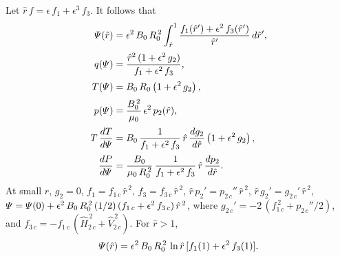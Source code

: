 \documentclass[12pt,prb,aps,notitlepage]{revtex4-1}
\begin{document}
Let $\hat{r}\,f = \epsilon\,f_1+\epsilon^3\,f_3$. 
It follows that
\begin{align}
{\mit\Psi}(\hat{r}) &= \epsilon^2\,B_0\,R_0^{\,2}\int_{\hat{r}}^1\frac{f_1(\hat{r}') +\epsilon^2\,f_3(\hat{r}')}{\hat{r}'}\,d\hat{r}',\\[0.5ex]
q({\mit\Psi})&= \frac{\hat{r}^2\,(1+\epsilon^2\,g_2)}{f_1+\epsilon^2\,f_3},\\[0.5ex]
T({\mit\Psi}) &= B_0\,R_0\left(1+\epsilon^2\,g_2\right),\\[0.5ex]
p({\mit\Psi})&= \frac{B_0^{\,2}}{\mu_0}\,\epsilon^2\,p_2(\hat{r}),\\[0.5ex]
T\,\frac{dT}{d{\mit\Psi}}&= B_0\,\frac{1}{f_1+\epsilon^2\,f_3}\,\hat{r}\,\frac{dg_2}{d\hat{r}}\left(1+\epsilon^2\,g_2\right),\\[0.5ex]
\frac{dP}{d{\mit\Psi}} &=\frac{B_0}{\mu_0\,R_0^{\,2}}\,\frac{1}{f_1+\epsilon^2\,f_3}\,\hat{r}\,\frac{dp_2}{d\hat{r}}.
\end{align}
At small $\hat{r}$, $g_2=0$, $f_1=f_{1\,c}\,\hat{r}^{\,2}$,  $f_3=f_{3\,c}\,\hat{r}^{\,2}$, $\hat{r}\,p_2'=p_{2\,c}''\,\hat{r}^{\,2}$, $\hat{r}\,g_2' = g_{2\,c}'\,\hat{r}^{\,2}$, 
${\mit\Psi}= {\mit\Psi}(0) + \epsilon^2\,B_0\,R_0^{\,2}\,(1/2)\,(f_{1\,c}+\epsilon^2\,f_{3\,c})\,\hat{r}^{\,2}$, 
where $g_{2\,c}'= -2\,(f_{1\,c}^{\,2}+p_{2\,c}''/2)$, and $f_{3\,c}=-f_{1\,c}\,(\hat{H}_{2\,c}^{\,2}+\hat{V}_{2\,c}^{\,2})$. 
For $\hat{r}>1$, 
\begin{equation}
{\mit\Psi}(\hat{r}) = \epsilon^2\,B_0\,R_0^{\,2}\,\ln\hat{r}\,[f_1(1)+\epsilon^2\,f_3(1)].
\end{equation}
\end{document}
